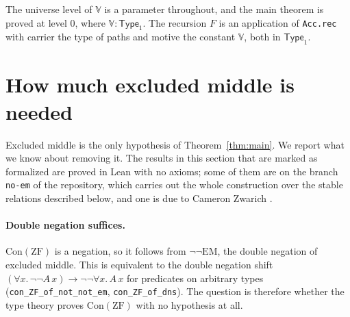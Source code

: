 \documentclass[10pt]{article}
\theoremstyle{definition}
\theoremstyle{remark}
\newcommand{\Type}{\mathsf{Type}}
\newcommand{\ZF}{\mathrm{ZF}}
\newcommand{\EM}{\mathrm{EM}}
\newcommand{\Con}{\mathrm{Con}}
\newcommand{\V}{\mathbb{V}}
\newcommand{\lean}[1]{\texttt{#1}}
\begin{document}
The universe level of $\V$ is a parameter throughout, and the main
theorem is proved at level $0$, where $\V:\Type_1$. The recursion $F$ is
an application of \lean{Acc.rec} with carrier the type of paths and
motive the constant $\V$, both in $\Type_1$.

\section{How much excluded middle is needed}\label{sec:em}

Excluded middle is the only hypothesis of Theorem~\ref{thm:main}. We
report what we know about removing it. The results in this section that
are marked as formalized are proved in Lean with no axioms; some of them
are on the branch \lean{no-em} of the repository, which carries out the
whole construction over the stable relations described below, and one
is due to Cameron Zwarich \cite{zwarich26}.

\paragraph{Double negation suffices.}
$\Con(\ZF)$ is a negation, so it follows from $\neg\neg\EM$, the double
negation of excluded middle. This is equivalent to the double negation
shift $(\forall x.\,\neg\neg A\,x)\to\neg\neg\forall x.\,A\,x$ for predicates on
arbitrary types (\lean{con\_ZF\_of\_not\_not\_em}, \lean{con\_ZF\_of\_dns}).
The question is therefore whether the type theory proves $\Con(\ZF)$
with no hypothesis at all.
\end{document}
